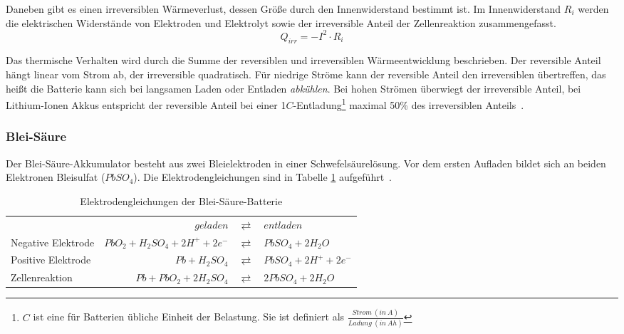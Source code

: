Daneben gibt es einen irreversiblen Wärmeverlust, dessen Größe durch den Innenwiderstand bestimmt ist. Im Innenwiderstand $R_i$ werden die elektrischen Widerstände von Elektroden und Elektrolyt sowie der irreversible Anteil der Zellenreaktion zusammengefasst.
\begin{equation}\label{gl_innenwiderstand}
Q_{irr}=-I^2\cdot R_i
\end{equation}

Das thermische Verhalten wird durch die Summe der reversiblen und irreversiblen Wärmeentwicklung beschrieben. Der reversible Anteil hängt linear vom Strom ab, der irreversible quadratisch. Für niedrige Ströme kann der reversible Anteil den irreversiblen übertreffen, das heißt die Batterie kann sich bei langsamen Laden oder Entladen \emph{abkühlen}. Bei hohen Strömen überwiegt der irreversible Anteil, bei Lithium-Ionen Akkus entspricht der reversible Anteil bei einer 1$C$-Entladung\footnote{$C$ ist eine für Batterien übliche Einheit der Belastung. Sie ist definiert als $\frac{Strom\ (in\ A)}{Ladung\ (in\ Ah)}$} maximal 50\% des irreversiblen Anteils~\cite{Viswanathan20103720}.


\subsubsection{Blei-Säure}
Der Blei-Säure-Akkumulator besteht aus zwei Bleielektroden in einer Schwefelsäurelösung. Vor dem ersten Aufladen bildet sich an beiden Elektronen Bleisulfat ($PbSO_4$). Die Elektrodengleichungen sind in Tabelle \ref{Pb} aufgeführt~\cite[S. 50]{KiehneBattery}.

\begin{table}\centering
	\begin{tabularx}{\linewidth}{XrcX}
		\toprule
		&                       $geladen$ & $\rightleftarrows$ & $entladen$             \\
		Negative Elektrode & $PbO_2 + H_2SO_4 + 2H^+ + 2e^-$ & $\rightleftarrows$ & $PbSO_4 + 2H_2O$       \\
		Positive Elektrode &                $Pb + H_2SO_4$ & $\rightleftarrows$ & $PbSO_4 + 2H^+ + 2e^-$ \\ \midrule
		Zellenreaktion     &         $Pb + PbO_2 + 2H_2SO_4$ & $\rightleftarrows$ & $2PbSO_4 + 2H_2O$      \\ \bottomrule
	\end{tabularx}
	\caption{Elektrodengleichungen der Blei-Säure-Batterie}
	\label{Pb}
\end{table}

